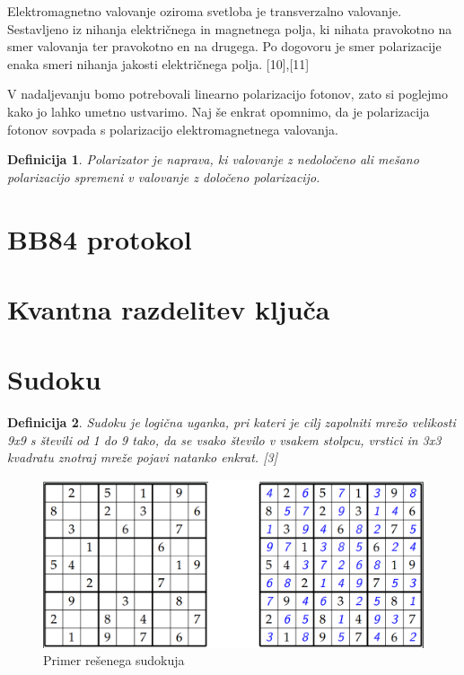 \documentclass[A4paper, 11pt]{article}
\newtheorem{definicija}{Definicija}
\begin{document}
Elektromagnetno valovanje oziroma svetloba je transverzalno valovanje. Sestavljeno iz nihanja električnega in magnetnega polja, ki nihata pravokotno na smer valovanja ter pravokotno en na drugega. Po dogovoru je smer polarizacije enaka smeri nihanja jakosti električnega polja. [10],[11]

V nadaljevanju bomo potrebovali linearno polarizacijo fotonov, zato si poglejmo kako jo lahko umetno ustvarimo. Naj še enkrat opomnimo, da je polarizacija fotonov sovpada s polarizacijo elektromagnetnega valovanja. 

\begin{definicija}
Polarizator je naprava, ki valovanje z nedoločeno ali mešano polarizacijo spremeni v valovanje z določeno polarizacijo.
\end{definicija}



\section{BB84 protokol}



\section{Kvantna razdelitev ključa}



\section{Sudoku}

\begin{definicija}
Sudoku je logična uganka, pri kateri je cilj zapolniti mrežo velikosti 9x9 s števili od 1 do 9 tako, da se vsako število v vsakem stolpcu, vrstici in 3x3 kvadratu znotraj mreže pojavi natanko enkrat. [3]
\end{definicija}

\begin{figure}[h]
\centering
\caption{Primer rešenega sudokuja}
\includegraphics[scale=0.4]{sudoku_resen}
\end{figure}
\end{document}
